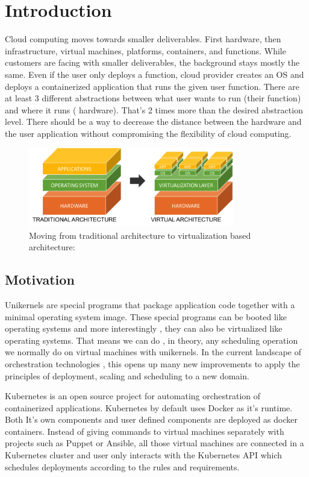 
\chapter{Introduction}\label{chapter:introduction}
Cloud computing moves towards smaller deliverables. First hardware, then infrastructure, virtual machines, platforms, containers, and functions. While customers are facing with smaller deliverables, the background stays mostly the same. Even if the user only deploys a function, cloud provider creates an OS and deploys a containerized application that runs the given user function. There are at least 3 different abstractions between what user wants to run (their function) and where it runs ( hardware). That's 2 times more than the desired abstraction level. There should be a way to decrease the distance between the hardware and the user application without compromising the flexibility of cloud computing. 
\begin{figure}[htpb]
  \centering
  \includegraphics[width=0.8\textwidth]{figures/1-123.png}
  \caption{Moving from traditional architecture to virtualization based architecture: \cite{arch-photo} } \label{fig:arch}
\end{figure}
\section{Motivation}
Unikernels are special programs that package application code together with a minimal operating system image.\cite{7396164} These special programs can be booted like operating systems and more interestingly , they can also be virtualized like operating systems. That means we can do , in theory, any scheduling operation we normally do on virtual machines with unikernels. In the current landscape of orchestration technologies , this opens up many new improvements to apply the principles of deployment, scaling and scheduling to a new domain.

Kubernetes is an open source project for automating orchestration of containerized applications. \cite{Hightower:2017:KUR:3175917} Kubernetes by default uses Docker as it's runtime. Both It's own components and user defined components are deployed as docker containers. Instead of giving commands to virtual machines separately with projects such as Puppet or Ansible, all those virtual machines are connected in a Kubernetes cluster and user only interacts with the Kubernetes API which schedules deployments according to the rules and requirements.

